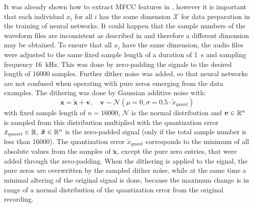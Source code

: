 It was already shown how to extract MFCC features in , however it is important that each individual $x_i$ for all $i$ has the same dimension $\mathcal{X}$ for data preparation in the training of neural networks.
It could happen that the sample numbers of the waveform files are inconsistent as described in  and therefore a different dimension may be obtained.
To ensure that all $x_i$ have the same dimension, the audio files were adjusted to the same fixed sample length of a duration of \SI{1}{\second} and sampling frequency \SI{16}{\kilo\hertz}.
This was done by zero-padding the signals to the desired length of 16000 samples.
Further dither noise was added, so that neural networks are not confused when operating with pure zeros emerging from the data examples.
The dithering was done by Gaussian additive noise with:
\begin{equation}\label{eq:exp_dither}
  \bm{x} = \bm{\tilde{x}} + \bm{v}, \quad \bm{v} \sim \mathcal{N}(\mu=0, \sigma=0.5 \cdot \tilde{x}_{quant}) 
\end{equation}
with fixed sample length of $n = 16000$, $\mathcal{N}$ is the normal distribution and $\bm{v} \in \mathbb{R}^n$ is sampled from this distribution multiplied with the quantization error $\tilde{x}_{quant} \in \mathbb{R}$, $\bm{\tilde{x}} \in \mathbb{R}^n$ is the zero-padded signal (only if the total sample number is less than 16000).
The quantization error $\tilde{x}_{quant}$ corresponds to the minimum of all absolute values from the samples of $\bm{\tilde{x}}$, except the pure zero entries, that were added through the zero-padding.
When the dithering is applied to the signal, the pure zeros are overwritten by the sampled dither noise, while at the same time a minimal altering of the original signal is done, because the maximum change is in range of a normal distribution of the quantization error from the original recording.
